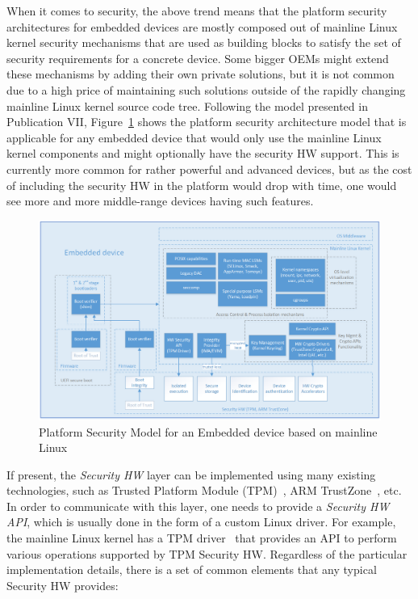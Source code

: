 When it comes to security, the above trend means that the platform security architectures for embedded devices are mostly composed out of mainline Linux kernel security mechanisms that are used as building blocks to satisfy the set of security requirements for a concrete device. Some bigger OEMs might extend these mechanisms by adding their own private solutions, but it is not common due to a high price of maintaining such solutions outside of the rapidly changing mainline Linux kernel source code tree. Following the model presented in Publication VII, Figure~\ref{fig:platsec} shows the platform security architecture model that is applicable for any embedded device that would only use the mainline Linux kernel components and might optionally have the security HW support. This is currently more common for rather powerful and advanced devices, but as the cost of including the security HW in the platform would drop with time, one would see more and more middle-range devices having such features. 


\begin{figure}[t]
	\centering
		\includegraphics[width=1\textwidth]{figures/LinuxKernelPlatSecModel.png}
	\caption{Platform Security Model for an Embedded device based on mainline Linux}
	\label{fig:platsec}
\end{figure}

If present, the \textit{Security HW} layer can be implemented using many existing technologies, such as Trusted Platform Module (TPM)~\cite{tpm}, ARM TrustZone~\cite{trustzone}, etc. In order to communicate with this layer, one needs to provide a \textit{Security HW API}, which is usually done in the form of a custom Linux driver. For example, the mainline Linux kernel has a TPM driver~\cite{tpmdriver} that provides an API to perform various operations supported by TPM Security HW. Regardless of the particular implementation details, there is a set of common elements that any typical Security HW provides:

